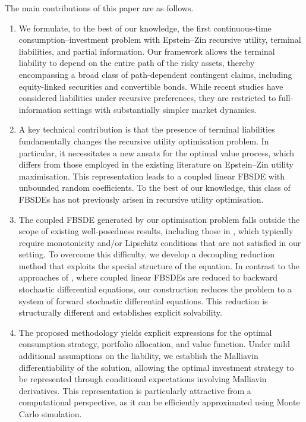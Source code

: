\documentclass[12,reqno]{amsart}
\numberwithin{equation}{section}
\begin{document}
The main contributions of this paper are as follows.
\begin{enumerate}	
	\item We formulate, to the best of our knowledge, the first continuous-time consumption--investment problem with Epstein--Zin recursive utility, terminal liabilities, and partial information. Our framework allows the terminal liability to depend on the entire path of the risky assets, thereby encompassing a broad class of path-dependent contingent claims, including equity-linked securities and convertible bonds. While recent studies \cite{dadzie2025robust,kuissi2026optimal} have considered liabilities under recursive preferences, they are restricted to full-information settings with substantially simpler market dynamics.
	
	\item A key technical contribution is that the presence of terminal liabilities fundamentally changes the recursive utility optimisation problem. In particular, it necessitates a new ansatz for the optimal value process, which differs from those employed in the existing literature on Epstein--Zin utility maximisation. This representation leads to a coupled linear FBSDE with unbounded random coefficients. To the best of our knowledge, this class of FBSDEs has not previously arisen in recursive utility optimisation.
	
	\item The coupled FBSDE generated by our optimisation problem falls outside the scope of existing well-posedness results, including those in \cite{ankirchner2022transformation,hu1995solution,ma2015well,pardoux1990adapted,pardoux1999forward,peng1999fully,xie2020exploration}, which typically require monotonicity and/or Lipschitz conditions that are not satisfied in our setting. To overcome this difficulty, we develop a decoupling reduction method that exploits the special structure of the equation. In contrast to the approaches of \cite{ma1994solving,yong1999linear,yong2006linear}, where coupled linear FBSDEs are reduced to backward stochastic differential equations, our construction reduces the problem to a system of forward stochastic differential equations. This reduction is structurally different and establishes explicit solvability.
	
	\item The proposed methodology yields explicit expressions for the optimal consumption strategy, portfolio allocation, and value function. Under mild additional assumptions on the liability, we establish the Malliavin differentiability of the solution, allowing the optimal investment strategy to be represented through conditional expectations involving Malliavin derivatives. This representation is particularly attractive from a computational perspective, as it can be efficiently approximated using Monte Carlo simulation.
	

\end{enumerate}
\end{document}
